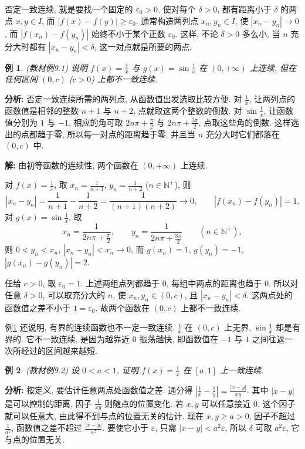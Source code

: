 \documentclass[UTF8,openany]{ctexbook}
\theoremstyle{chinesetextbook}
\newtheorem{example}{例}[section]
\newenvironment{cnsolution}{\par\indent\textbf{解:} \ignorespaces}{\par}
\begin{document}
否定一致连续, 就是要找一个固定的 $\varepsilon_0>0$, 使对每个 $\delta>0$, 都有距离小于 $\delta$ 的两点 $x,y\in I$, 而 $|f(x)-f(y)|\ge\varepsilon_0$. 通常构造两列点 $x_n,y_n\in I$, 使 $|x_n-y_n|\to0$, 而 $|f(x_n)-f(y_n)|$ 始终不小于某个正数 $\varepsilon_0$. 这样, 不论 $\delta>0$ 多么小, 当 $n$ 充分大时都有 $|x_n-y_n|<\delta$, 这一对点就是所要的两点.
\begin{example}\label{ex:9-1}
\textnormal{(教材例9.1)} 说明 $\displaystyle f(x)=\frac1x$ 与 $\displaystyle g(x)=\sin\frac1x$ 在 $(0,+\infty)$ 上连续, 但在任何区间 $(0,c)$ ($c>0$) 上都不一致连续.
\end{example}
\par\indent\textbf{分析:} 否定一致连续所需的两列点, 从函数值出发选取比较方便. 对 $\displaystyle\frac1x$, 让两列点的函数值是相邻的整数 $n+1$ 与 $n+2$, 点就取这两个整数的倒数. 对 $\displaystyle\sin\frac1x$, 让函数值分别为 $1$ 与 $-1$, 相应的角可取 $\displaystyle2n\pi+\frac\pi2$ 与 $\displaystyle2n\pi+\frac{3\pi}2$, 点取这些角的倒数. 这样选出的点都趋于零, 所以每一对点的距离趋于零, 并且当 $n$ 充分大时它们都落在 $(0,c)$ 中.
\begin{cnsolution}
由初等函数的连续性, 两个函数在 $(0,+\infty)$ 上连续.

对 $\displaystyle f(x)=\frac1x$, 取 $\displaystyle x_n=\frac1{n+1}$, $\displaystyle y_n=\frac1{n+2}$ ($n\in\mathbb N^+$), 则
\[
|x_n-y_n|=\frac1{n+1}-\frac1{n+2}=\frac1{(n+1)(n+2)}\to0,\qquad|f(x_n)-f(y_n)|=1.
\]
对 $\displaystyle g(x)=\sin\frac1x$, 取
\[
x_n=\frac1{2n\pi+\frac\pi2},\qquad y_n=\frac1{2n\pi+\frac{3\pi}2}\qquad(n\in\mathbb N^+),
\]
则 $0<y_n<x_n$, $|x_n-y_n|<x_n\to0$, 而 $g(x_n)=1$, $g(y_n)=-1$, $|g(x_n)-g(y_n)|=2$.

任给 $c>0$, 取 $\varepsilon_0=1$. 上述两组点列都趋于 $0$, 每组中两点的距离也趋于 $0$. 所以对任意 $\delta>0$, 可以取充分大的 $n$, 使 $x_n,y_n\in(0,c)$, 且 $|x_n-y_n|<\delta$. 这两点处的函数值之差不小于 $1=\varepsilon_0$. 故两个函数在 $(0,c)$ 上都不一致连续.
\end{cnsolution}
例\ref{ex:9-1} 还说明, 有界的连续函数也不一定一致连续. $\displaystyle\frac1x$ 在 $(0,c)$ 上无界, $\displaystyle\sin\frac1x$ 却是有界的. 它不一致连续, 是因为越靠近 $0$ 振荡越快, 即函数值在 $-1$ 与 $1$ 之间往返一次所经过的区间越来越短.
\begin{example}
\textnormal{(教材例9.2)} 设 $0<a<1$, 证明 $\displaystyle f(x)=\frac1x$ 在 $[a,1]$ 上一致连续.
\end{example}
\par\indent\textbf{分析:} 按定义, 要估计任意两点处函数值之差. 通分得 $\displaystyle\left|\frac1x-\frac1y\right|=\frac{|x-y|}{xy}$. 其中 $|x-y|$ 是可以控制的距离, 因子 $\displaystyle\frac1{xy}$ 则随点的位置变化. 若 $x,y$ 可以任意接近 $0$, 这个因子就可以任意大, 由此得不到与点的位置无关的估计. 现在 $x,y\ge a>0$, 因子不超过 $\displaystyle\frac1{a^2}$, 函数值之差不超过 $\displaystyle\frac{|x-y|}{a^2}$. 要使它小于 $\varepsilon$, 只需 $|x-y|<a^2\varepsilon$, 所以 $\delta$ 可取 $a^2\varepsilon$, 它与点的位置无关.
\end{document}
